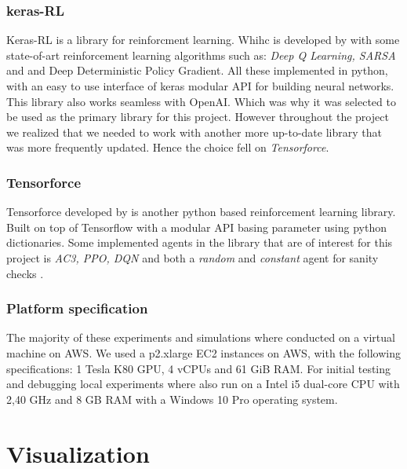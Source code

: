 \documentclass{kththesis}
\theoremstyle{definition}
\begin{document}
\subsubsection*{keras-RL}
Keras-RL is a library for reinforcment learning. Whihc is developed by \textcite{plappert2016kerasrl} with some state-of-art reinforcement learning algorithms such as: \textit{Deep Q Learning, SARSA} and and Deep Deterministic Policy Gradient. All these implemented in python, with an easy to use interface of keras modular API for building neural networks. This library also works seamless with OpenAI. Which was why it was selected to be used as the primary library for this project. However throughout the project we realized that we needed to work with another more up-to-date library that was more frequently updated. Hence the choice fell on \textit{Tensorforce}.  

\subsubsection*{Tensorforce}
Tensorforce developed by \textcite{schaarschmidt2017tensorforce} is another python based reinforcement learning library. Built on top of Tensorflow with a modular API basing parameter using python dictionaries. Some implemented agents in the library that are of interest for this project is \textit{AC3, PPO, DQN} and both a \textit{random} and \textit{constant} agent for sanity checks \parencite{schaarschmidt2017tensorforce}.

\subsubsection*{Platform specification}
The majority of these experiments and simulations where conducted on a virtual machine on AWS. 
We used a p2.xlarge EC2 instances on AWS, with the following specifications: 1 Tesla K80 GPU, 4 vCPUs and 61 GiB RAM. For initial testing and debugging local experiments where also run on a Intel i5 dual-core CPU with 2,40 GHz and 8 GB RAM with a Windows 10 Pro operating system. 


\section{Visualization}
\end{document}
